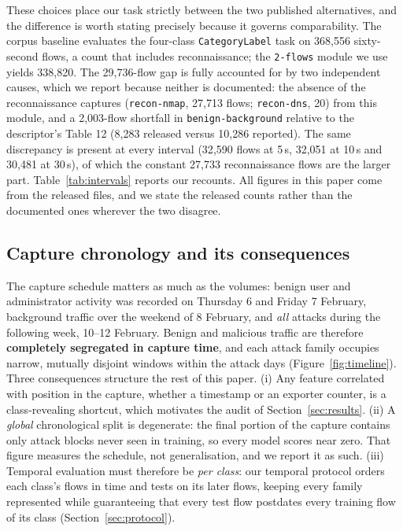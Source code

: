 \documentclass[review,12pt]{elsarticle}
\begin{document}
These choices place our task strictly between the two published
alternatives, and the difference is worth stating precisely because it
governs comparability. The corpus baseline \cite{silva2025binary} evaluates
the four-class \texttt{CategoryLabel} task on 368{,}556 sixty-second flows,
a count that includes reconnaissance; the \texttt{2-flows} module we use
yields 338{,}820. The 29{,}736-flow gap is fully accounted for by two
independent causes, which we report because neither is documented: the
absence of the reconnaissance captures (\texttt{recon-nmap}, 27{,}713 flows;
\texttt{recon-dns}, 20) from this module, and a 2{,}003-flow shortfall in
\texttt{benign-background} relative to the descriptor's Table 12
(8{,}283 released versus 10{,}286 reported). The same discrepancy is present at every
interval (32{,}590 flows at 5\,s, 32{,}051 at 10\,s and 30{,}481 at 30\,s), of which
the constant 27{,}733 reconnaissance flows are the larger part.
Table~\ref{tab:intervals} reports our recounts. All figures in this paper come from the
released files, and we state the released counts rather than the documented ones wherever
the two disagree.

\subsection{Capture chronology and its consequences}
\label{sec:chronology}
The capture schedule matters as much as the volumes: benign user and
administrator activity was recorded on Thursday 6 and Friday 7 February,
background traffic over the weekend of 8 February, and \emph{all} attacks
during the following week, 10--12 February. Benign and malicious traffic
are therefore \textbf{completely segregated in capture time}, and each
attack family occupies narrow, mutually disjoint windows within the attack
days (Figure~\ref{fig:timeline}). Three consequences structure the rest of
this paper. (i) Any feature correlated with position in the capture, whether
a timestamp or an exporter counter, is a class-revealing shortcut,
which motivates the audit of Section~\ref{sec:results}. (ii) A
\emph{global} chronological split is degenerate: the final portion of the
capture contains only attack blocks never seen in training, so every model
scores near zero. That figure measures the schedule, not generalisation, and
we report it as such. (iii) Temporal evaluation must therefore be
\emph{per class}: our temporal protocol orders each class's flows in time
and tests on its later flows, keeping every family represented while
guaranteeing that every test flow postdates every training flow of its
class (Section~\ref{sec:protocol}).
\end{document}
